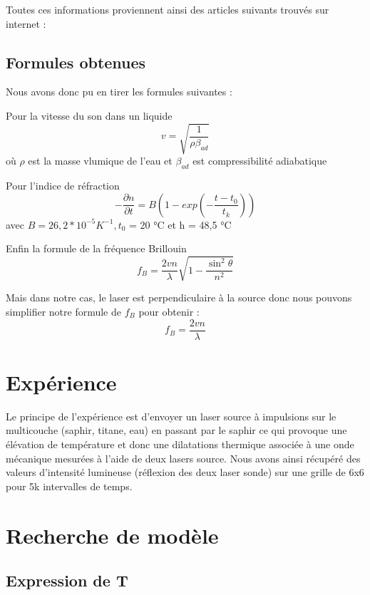 \documentclass{rapportECC}
\begin{document}
Toutes ces informations proviennent ainsi des articles suivants trouvés sur internet :
\cite{}


\subsection{Formules obtenues}

Nous avons donc pu en tirer les formules suivantes :

Pour la vitesse du son dans un liquide
\begin{equation}
    v = \sqrt{\frac{1}{\rho \beta_{ad}}}
\end{equation}
où $\rho$ est la masse vlumique de l'eau et $\beta_{ad}$ est compressibilité adiabatique

Pour l'indice de réfraction 
\begin{equation}
    -\frac{\partial n}{\partial t} = B(1-exp(-\frac{t-t_0}{t_k}))
\end{equation}
avec $B=26,2*10^{-5} K^{-1}, t_0$ = 20 °C et h = 48,5 °C

Enfin la formule de la fréquence Brillouin
\begin{equation}
    f_B = \frac{2vn}{\lambda}\sqrt{1-\frac{\sin^2{\theta}}{n^2}}
\end{equation}

Mais dans notre cas, le laser est perpendiculaire à la source donc nous pouvons simplifier notre formule de $f_B$ pour obtenir :
\begin{equation}
    f_B =  \frac{2vn}{\lambda}
\end{equation}

\section{Expérience}

Le principe de l'expérience est d'envoyer un laser source à impulsions sur le multicouche (saphir, titane, eau) en passant par le saphir ce qui provoque une élévation de température et donc une dilatations thermique associée à une onde mécanique mesurées à l'aide de deux lasers source. Nous avons ainsi récupéré des valeurs d'intensité lumineuse (réflexion des deux laser sonde) sur une grille de 6x6 pour 5k intervalles de temps.

\section{Recherche de modèle}

\subsection{Expression de T}
\end{document}
